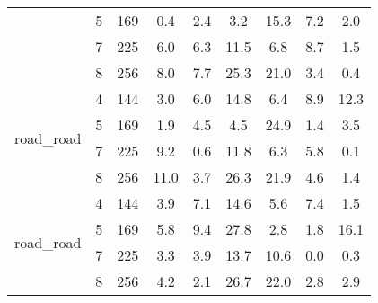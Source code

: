 \begin{tabular}[c]{| l | c | c | c | c | c | c | c | c |}
 & 5 & 169 & \cellcolor{blue!25} 0.4 & \cellcolor{red!25} 2.4 & 3.2 & 15.3 & 7.2 & 2.0 \\ \cline{2-9}
 & 7 & 225 & 6.0 & \cellcolor{green!25} 6.3 & 11.5 & 6.8 & 8.7 & 1.5 \\ \cline{2-9}
 & 8 & 256 & 8.0 & \cellcolor{green!25} 7.7 & 25.3 & 21.0 & 3.4 & 0.4 \\ \hline
\multirow{4}{*}{road\_road} & 4 & 144 & 3.0 & \cellcolor{green!25} 6.0 & 14.8 & 6.4 & 8.9 & 12.3 \\ \cline{2-9}
 & 5 & 169 & 1.9 & \cellcolor{green!25} 4.5 & 4.5 & 24.9 & 1.4 & 3.5 \\ \cline{2-9}
 & 7 & 225 & 9.2 & \cellcolor{green!25} 0.6 & 11.8 & 6.3 & 5.8 & 0.1 \\ \cline{2-9}
 & 8 & 256 & 11.0 & \cellcolor{green!25} 3.7 & 26.3 & 21.9 & 4.6 & 1.4 \\ \hline
\multirow{4}{*}{road\_road} & 4 & 144 & 3.9 & \cellcolor{green!25} 7.1 & 14.6 & 5.6 & 7.4 & 1.5 \\ \cline{2-9}
 & 5 & 169 & 5.8 & \cellcolor{green!25} 9.4 & 27.8 & 2.8 & 1.8 & 16.1 \\ \cline{2-9}
 & 7 & 225 & 3.3 & \cellcolor{green!25} 3.9 & 13.7 & 10.6 & 0.0 & 0.3 \\ \cline{2-9}
 & 8 & 256 & 4.2 & \cellcolor{green!25} 2.1 & 26.7 & 22.0 & 2.8 & 2.9 \\ \hline
\end{tabular} 
